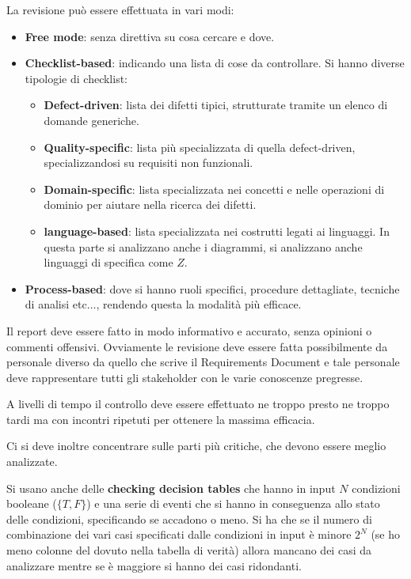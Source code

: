 La revisione può essere effettuata in vari modi:
\begin{itemize}
      \item \textbf{Free mode}: senza direttiva su cosa cercare e dove.
      \item \textbf{Checklist-based}: indicando una lista di cose da controllare. 
            Si hanno diverse tipologie di checklist:
            \begin{itemize}
                  \item \textbf{Defect-driven}: lista dei difetti tipici, 
                        strutturate tramite un elenco di domande generiche.
                  \item \textbf{Quality-specific}: lista più specializzata di 
                        quella defect-driven, specializzandosi su requisiti non funzionali.
                  \item \textbf{Domain-specific}: lista specializzata nei concetti e nelle
                        operazioni di dominio per aiutare nella ricerca dei difetti.
                  \item \textbf{language-based}: lista specializzata nei costrutti legati ai
                        linguaggi. In questa parte si analizzano anche i diagrammi, si
                        analizzano anche linguaggi di specifica come $Z$.
            \end{itemize}
      \item \textbf{Process-based}: dove si hanno ruoli specifici, procedure
            dettagliate, tecniche di analisi etc$\dots$, rendendo questa la
            modalità più efficace.
\end{itemize}
Il report deve essere fatto in modo informativo e accurato, senza opinioni o
commenti offensivi. Ovviamente le revisione deve essere fatta possibilmente da
personale diverso da quello che scrive il Requirements Document e tale personale
deve rappresentare tutti gli stakeholder con le varie conoscenze pregresse.

A livelli di tempo il controllo deve essere effettuato ne troppo presto ne troppo
tardi ma con incontri ripetuti per ottenere la massima efficacia.

Ci si deve inoltre concentrare sulle parti più critiche, che devono essere meglio
analizzate.

Si usano anche delle \textbf{checking decision tables} che hanno in input $N$
condizioni booleane ($\{T, F\}$) e una serie di eventi che si hanno in conseguenza
allo stato delle condizioni, specificando se accadono o meno. Si ha che se il
numero di combinazione dei vari casi specificati dalle condizioni in input è minore
$2^N$ (se ho meno colonne del dovuto nella tabella di verità) allora mancano dei
casi da analizzare mentre se è maggiore si hanno dei casi ridondanti.

